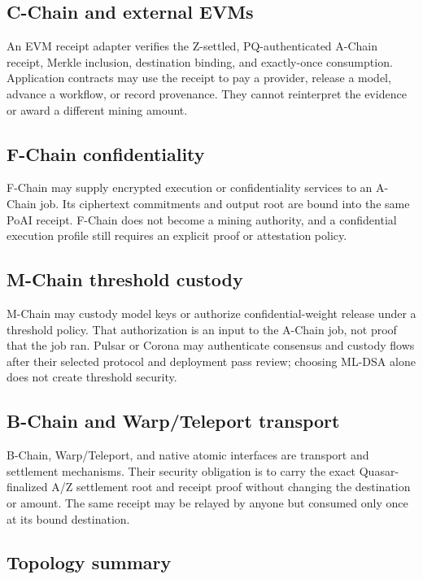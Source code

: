 \subsection{C-Chain and external EVMs}

An EVM receipt adapter verifies the Z-settled, PQ-authenticated A-Chain receipt,
Merkle inclusion, destination binding, and exactly-once consumption. Application
contracts may use the receipt to pay a provider, release a model, advance a
workflow, or record provenance. They cannot reinterpret the evidence or award a
different mining amount.

\subsection{F-Chain confidentiality}

F-Chain may supply encrypted execution or confidentiality services to an
A-Chain job. Its ciphertext commitments and output root are bound into the same
PoAI receipt. F-Chain does not become a mining authority, and a confidential
execution profile still requires an explicit proof or attestation policy.

\subsection{M-Chain threshold custody}

M-Chain may custody model keys or authorize confidential-weight release under a
threshold policy. That authorization is an input to the A-Chain job, not proof
that the job ran. Pulsar or Corona may authenticate consensus and custody flows
after their selected protocol and deployment pass review; choosing ML-DSA alone
does not create threshold security.

\subsection{B-Chain and Warp/Teleport transport}

B-Chain, Warp/Teleport, and native atomic interfaces are transport and
settlement mechanisms. Their security obligation is to carry the exact
Quasar-finalized A/Z settlement root and receipt proof without changing the
destination or amount. The same receipt may be relayed by anyone but consumed
only once at its bound destination.

\subsection{Topology summary}

